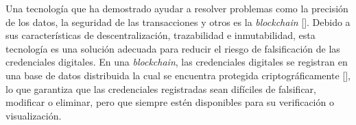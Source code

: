 Una tecnología que ha demostrado ayudar a resolver problemas como la precisión de los datos, la seguridad de las transacciones y otros es la \textit{blockchain} [\cite{1, 66}]. Debido a sus características de descentralización, trazabilidad e inmutabilidad, esta tecnología es una solución adecuada para reducir el riesgo de falsificación de las credenciales digitales. En una \textit{blockchain}, las credenciales digitales se registran en una base de datos distribuida la cual se encuentra protegida criptográficamente [\cite{2}], lo que garantiza que las credenciales registradas sean difíciles de falsificar, modificar o eliminar, pero que siempre estén disponibles para su verificación o visualización.




%

